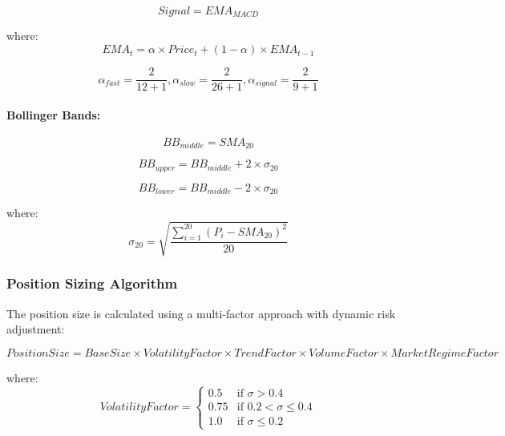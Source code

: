 \documentclass[conference]{IEEEtran}
\begin{document}
\begin{equation}
Signal = EMA_{MACD}
\end{equation}

where:
\begin{equation}
EMA_t = \alpha \times Price_t + (1 - \alpha) \times EMA_{t-1}
\end{equation}

\begin{equation}
\alpha_{fast} = \frac{2}{12 + 1}, \alpha_{slow} = \frac{2}{26 + 1}, \alpha_{signal} = \frac{2}{9 + 1}
\end{equation}

\paragraph{Bollinger Bands:}
\begin{equation}
BB_{middle} = SMA_{20}
\end{equation}

\begin{equation}
BB_{upper} = BB_{middle} + 2 \times \sigma_{20}
\end{equation}

\begin{equation}
BB_{lower} = BB_{middle} - 2 \times \sigma_{20}
\end{equation}

where:
\begin{equation}
\sigma_{20} = \sqrt{\frac{\sum_{i=1}^{20} (P_i - SMA_{20})^2}{20}}
\end{equation}

\subsubsection{Position Sizing Algorithm}
The position size is calculated using a multi-factor approach with dynamic risk adjustment:

\begin{equation}
PositionSize = BaseSize \times VolatilityFactor \times TrendFactor \times VolumeFactor \times MarketRegimeFactor
\end{equation}

where:
\begin{equation}
VolatilityFactor = \begin{cases}
0.5 & \text{if } \sigma > 0.4 \\
0.75 & \text{if } 0.2 < \sigma \leq 0.4 \\
1.0 & \text{if } \sigma \leq 0.2
\end{cases}
\end{equation}
\end{document}
